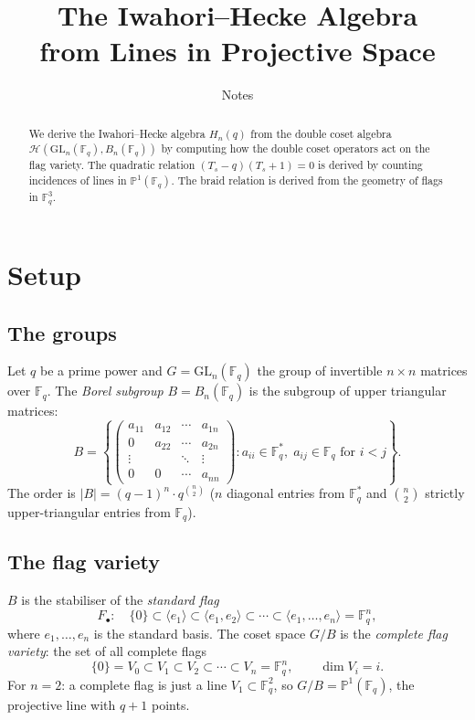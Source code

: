 \documentclass[12pt,a4paper]{article}
\title{The Iwahori--Hecke Algebra\\from Lines in Projective Space}
\author{Notes}
\date{}
\theoremstyle{definition}
\theoremstyle{remark}
\newcommand{\F}{\mathbb{F}}
\newcommand{\GL}{\mathrm{GL}}
\newcommand{\Hecke}{\mathcal{H}}
\newcommand{\PP}{\mathbb{P}}
\begin{document}
\maketitle

\begin{abstract}
We derive the Iwahori--Hecke algebra $H_n(q)$ from the double coset
algebra $\Hecke(\GL_n(\F_q), B_n(\F_q))$ by computing how the double
coset operators act on the flag variety. The quadratic relation
$(T_s - q)(T_s + 1) = 0$ is derived by counting incidences of lines
in $\PP^1(\F_q)$. The braid relation is derived from the geometry of
flags in $\F_q^3$.
\end{abstract}

\tableofcontents

\section{Setup}
\label{sec:setup}

\subsection{The groups}

Let $q$ be a prime power and $G = \GL_n(\F_q)$ the group of invertible
$n \times n$ matrices over $\F_q$. The \emph{Borel subgroup}
$B = B_n(\F_q)$ is the subgroup of upper triangular matrices:
\[
  B = \left\{\begin{pmatrix} a_{11} & a_{12} & \cdots & a_{1n} \\
  0 & a_{22} & \cdots & a_{2n} \\
  \vdots & & \ddots & \vdots \\
  0 & 0 & \cdots & a_{nn} \end{pmatrix} : a_{ii} \in \F_q^*,\;
  a_{ij} \in \F_q \text{ for } i < j\right\}.
\]
The order is $|B| = (q-1)^n \cdot q^{\binom{n}{2}}$ ($n$ diagonal
entries from $\F_q^*$ and $\binom{n}{2}$ strictly upper-triangular
entries from $\F_q$).

\subsection{The flag variety}

$B$ is the stabiliser of the \emph{standard flag}
\[
  F_\bullet : \quad \{0\} \subset \langle e_1 \rangle \subset
  \langle e_1, e_2 \rangle \subset \cdots \subset
  \langle e_1, \ldots, e_n \rangle = \F_q^n,
\]
where $e_1, \ldots, e_n$ is the standard basis. The coset space
$G/B$ is the \emph{complete flag variety}: the set of all complete
flags
\[
  \{0\} = V_0 \subset V_1 \subset V_2 \subset \cdots \subset V_n =
  \F_q^n, \qquad \dim V_i = i.
\]
For $n = 2$: a complete flag is just a line $V_1 \subset \F_q^2$,
so $G/B = \PP^1(\F_q)$, the projective line with $q + 1$ points.
\end{document}
